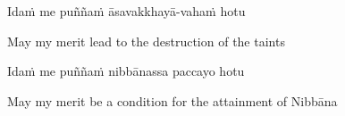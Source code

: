 Idaṁ me puññaṁ āsavakkhayā-vahaṁ hotu

\begin{english}
  May my merit lead to the destruction of the taints
\end{english}

Idaṁ me puññaṁ nibbānassa paccayo hotu

\begin{english-hang}
  May my merit be a condition for the attainment of Nibbāna
\end{english-hang}


\ifdigital{}\fi

\endgroup

